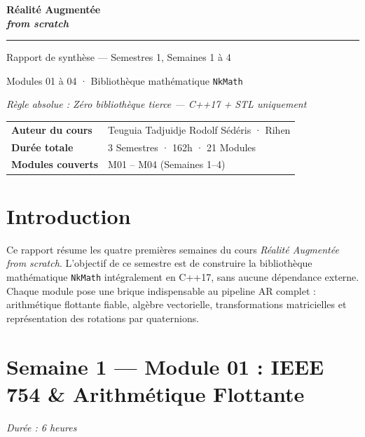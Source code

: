 \documentclass[11pt,a4paper]{article}
\begin{document}
\begin{titlepage}
  \centering
  \vspace*{2cm}
  {\Huge\bfseries\color{nkblue} Réalité Augmentée\\[6pt] \textit{from scratch}\par}
  \vspace{0.5cm}
  \rule{0.6\linewidth}{1.2pt}
  \vspace{0.5cm}

  {\large Rapport de synthèse — Semestres 1, Semaines 1 à 4\par}
  \vspace{0.3cm}
  {\normalsize Modules 01 à 04 · Bibliothèque mathématique \texttt{NkMath}\par}
  \vspace{1cm}
  {\small\textit{Règle absolue : Zéro bibliothèque tierce — C++17 + STL uniquement}\par}
  \vspace{2cm}

  \begin{tabular}{ll}
    \textbf{Auteur du cours} & Teuguia Tadjuidje Rodolf Sédéris · Rihen \\
    \textbf{Durée totale}    & 3 Semestres · 162h · 21 Modules \\
    \textbf{Modules couverts} & M01 – M04 (Semaines 1–4) \\
  \end{tabular}
  \vfill
\end{titlepage}

\section*{Introduction}
Ce rapport résume les quatre premières semaines du cours \textit{Réalité Augmentée from scratch}.
L'objectif de ce semestre est de construire la bibliothèque mathématique \texttt{NkMath} intégralement
en C++17, sans aucune dépendance externe. Chaque module pose une brique indispensable au
pipeline AR complet : arithmétique flottante fiable, algèbre vectorielle, transformations matricielles
et représentation des rotations par quaternions.

\tableofcontents
\newpage

\section{Semaine 1 — Module 01 : IEEE 754 \& Arithmétique Flottante}
\textit{Durée : 6 heures}
\end{document}
